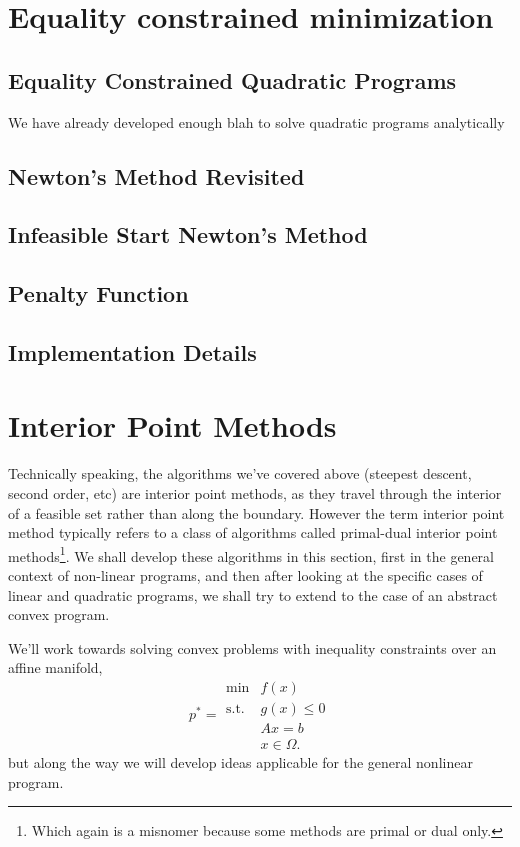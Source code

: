 \documentclass{article}
\numberwithin{equation}{section}
\theoremstyle{definition}
\newcommand{\tst}{\text{s.t.}}
\begin{document}
\section{Equality constrained minimization}
\subsection{Equality Constrained Quadratic Programs}
We have already developed enough blah to solve quadratic programs analytically
\subsection{Newton's Method Revisited}
\subsection{Infeasible Start Newton's Method}
\subsection{Penalty Function}
\subsection{Implementation Details}
\section{Interior Point Methods}
Technically speaking, the algorithms we've covered above (steepest descent, second order, etc) are interior point methods, as they travel through the interior of a feasible set rather than along the boundary. However the term interior point method typically refers to a class of algorithms called primal-dual interior point methods\footnote{Which again is a misnomer because some methods are primal or dual only.}. We shall develop these algorithms in this section, first in the general context of non-linear programs, and then after looking at the specific cases of linear and quadratic programs, we shall try to extend to the case of an abstract convex program.

We'll work towards solving convex problems with inequality constraints over an affine manifold,
\begin{equation}
    p^*=\begin{array}{cc}
         \min & f(x)  \\
         \tst & g(x)\le 0\\
              & Ax=b\\
              & x\in\Omega.
    \end{array}
\end{equation}
but along the way we will develop ideas applicable for the general nonlinear program.
\end{document}
